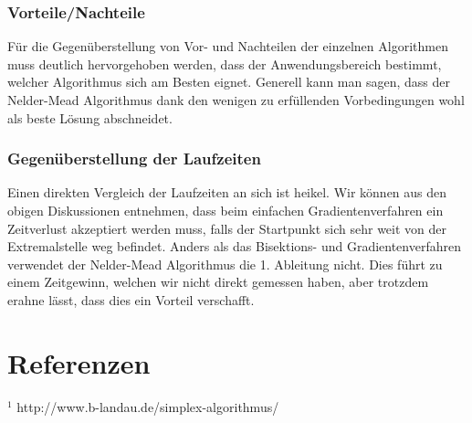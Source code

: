 \documentclass[10pt]{article}         %
\begin{document}
\subsubsection{Vorteile/Nachteile}
Für die Gegenüberstellung von Vor- und Nachteilen der einzelnen Algorithmen muss deutlich hervorgehoben werden, dass der Anwendungsbereich bestimmt, welcher Algorithmus sich am Besten eignet. Generell kann man sagen, dass der Nelder-Mead Algorithmus dank den wenigen zu erfüllenden Vorbedingungen wohl als beste Lösung abschneidet. 
\subsubsection{Gegenüberstellung der Laufzeiten}
Einen direkten Vergleich der Laufzeiten an sich ist heikel. Wir können aus den obigen Diskussionen entnehmen, dass beim einfachen Gradientenverfahren ein Zeitverlust akzeptiert werden muss, falls der Startpunkt sich sehr weit von der Extremalstelle weg befindet. Anders als das Bisektions- und Gradientenverfahren verwendet der Nelder-Mead Algorithmus die 1. Ableitung nicht. Dies führt zu einem Zeitgewinn, welchen wir nicht direkt gemessen haben, aber trotzdem erahne lässt, dass dies ein Vorteil verschafft.

\section{Referenzen}
\begin{list}{}{}
\item $^1$ http://www.b-landau.de/simplex-algorithmus/
\end{list}
\end{document}
